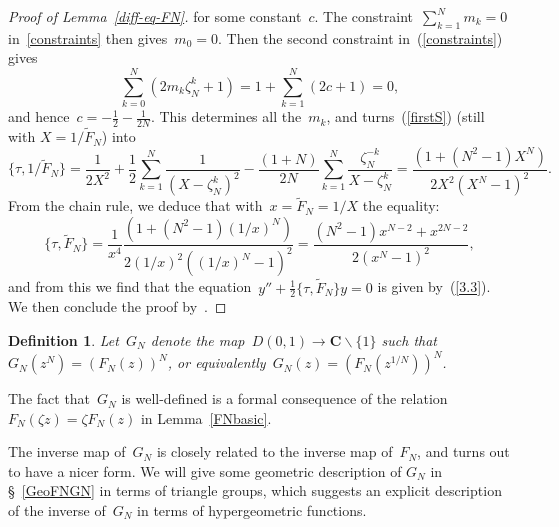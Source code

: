 \documentclass[10pt]{amsart}
\def\SSSS{\S}
\renewcommand\setminus{\smallsetminus}
\def\wF{\widetilde{F}}
\newtheorem{df}[subsubsection]{Definition}
\theoremstyle{remark}
\numberwithin{equation}{subsection}
\def\C{\mathbf{C}}
\begin{document}
\begin{proof}[Proof of Lemma~\ref{diff-eq-FN}]
for some constant~$c$. 
The constraint~$\sum_{k=1}^{N} m_k = 0$ in~\eqref{constraints} then gives~$m_0 = 0$.
Then the second constraint in~(\ref{constraints}) gives 
$$\sum_{k=0}^{N} (2 m_k \zeta_N^k + 1) = 1 + \sum_{k=1}^{N} (2c + 1) = 0,$$
and hence~$c = -\frac{1}{2} - \frac{1}{2N}$. This determines all the~$m_k$, and turns~(\ref{firstS}) (still with $X=1/\wF_N$) into
$$\{\tau,1/\wF_N\} 
=
 \frac{1}{2 X^2} + \frac{1}{2} \sum_{k=1}^N \frac{1}{(X  - \zeta_N^k)^2}
- \frac{(1+N)}{2N} \sum_{k=1}^{N} \frac{\zeta_N^{-k}}{X - \zeta_N^k} = \frac{ (1 + (N^2  - 1) X^N)}{2 X^2 (X^N - 1)^2}.$$
From the chain rule, we deduce that with~$x = \wF_N = 1/X$
the equality:
$$\{\tau,\wF_N\} = \frac{1}{x^4} \frac{ (1 + (N^2  - 1) (1/x)^N)}{2 (1/x)^2 ((1/x)^N - 1)^2}
=
\frac{(N^2 - 1) x^{N-2} + x^{2N-2}}{2 (x^N- 1)^2},
$$
and from this we find that the equation~$y'' + \frac{1}{2} \{\tau,\wF_N\} y=  0$ 
is given by~(\ref{3.3}). We then conclude the proof by~\cite[Lemma~3.3]{Hempel}. 
\end{proof}






\begin{df}  \label{GN} Let~$G_N$ denote the map~$D(0,1) \rightarrow \C \setminus \{1\}$ such
that~$G_N(z^N) = (F_N(z))^N$, or equivalently~$G_N(z) = (F_N(z^{1/N}))^N$.
\end{df}

The fact that~$G_N$ is well-defined is a formal consequence of the relation~$F_N(\zeta z) = \zeta F_N(z)$ in Lemma~\ref{FNbasic}. 


The inverse map of~$G_N$ is closely related to the inverse map of~$F_N$, and turns out to have a nicer form. We will give some geometric description of $G_N$ in \SSSS~\ref{GeoFNGN} in terms of triangle groups, which suggests an explicit description of the inverse of~$G_N$ in terms of hypergeometric functions.
\end{document}
